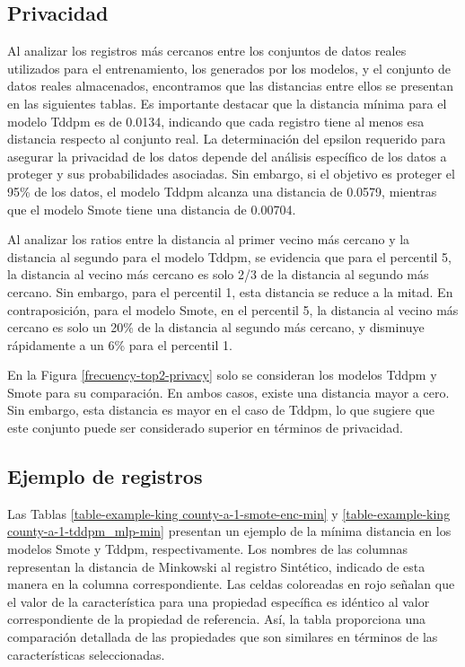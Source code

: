\subsection{Privacidad}
Al analizar los registros más cercanos entre los conjuntos de datos reales utilizados para el entrenamiento, los generados por los modelos, y el conjunto de datos reales almacenados, encontramos que las distancias entre ellos se presentan en las siguientes tablas. Es importante destacar que la distancia mínima para el modelo Tddpm es de 0.0134, indicando que cada registro tiene al menos esa distancia respecto al conjunto real. La determinación del epsilon requerido para asegurar la privacidad de los datos depende del análisis específico de los datos a proteger y sus probabilidades asociadas. Sin embargo, si el objetivo es proteger el 95\% de los datos, el modelo Tddpm alcanza una distancia de 0.0579, mientras que el modelo Smote tiene una distancia de 0.00704.





\newpage
Al analizar los ratios entre la distancia al primer vecino más cercano y la distancia al segundo para el modelo Tddpm, se evidencia que para el percentil 5, la distancia al vecino más cercano es solo 2/3 de la distancia al segundo más cercano. Sin embargo, para el percentil 1, esta distancia se reduce a la mitad. En contraposición, para el modelo Smote, en el percentil 5, la distancia al vecino más cercano es solo un 20\% de la distancia al segundo más cercano, y disminuye rápidamente a un 6\% para el percentil 1.





\newpage
En la Figura \ref{frecuency-top2-privacy} solo se consideran los modelos Tddpm y Smote para su comparación. En ambos casos, existe una distancia mayor a cero. Sin embargo, esta distancia es mayor en el caso de Tddpm, lo que sugiere que este conjunto puede ser considerado superior en términos de privacidad.



\newpage
\subsection{Ejemplo de registros}
Las Tablas \ref{table-example-king county-a-1-smote-enc-min} y \ref{table-example-king county-a-1-tddpm_mlp-min} presentan un ejemplo de la mínima distancia en los modelos Smote y Tddpm, respectivamente. Los nombres de las columnas representan la distancia de Minkowski al registro Sintético, indicado de esta manera en la columna correspondiente. Las celdas coloreadas en rojo señalan que el valor de la característica para una propiedad específica es idéntico al valor correspondiente de la propiedad de referencia. Así, la tabla proporciona una comparación detallada de las propiedades que son similares en términos de las características seleccionadas.

